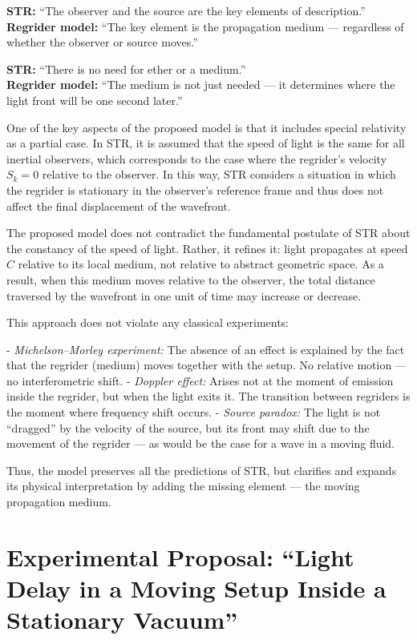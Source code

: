 \documentclass[12pt]{article}
\begin{document}
\textbf{STR:} “The observer and the source are the key elements of description.”\\
\textbf{Regrider model:} “The key element is the propagation medium — regardless of whether the observer or source moves.”

\textbf{STR:} “There is no need for ether or a medium.”\\
\textbf{Regrider model:} “The medium is not just needed — it determines where the light front will be one second later.”

One of the key aspects of the proposed model is that it includes special relativity as a partial case. In STR, it is assumed that the speed of light is the same for all inertial observers, which corresponds to the case where the regrider’s velocity $S_k = 0$ relative to the observer. In this way, STR considers a situation in which the regrider is stationary in the observer's reference frame and thus does not affect the final displacement of the wavefront.

The proposed model does not contradict the fundamental postulate of STR about the constancy of the speed of light. Rather, it refines it: light propagates at speed $C$ relative to its local medium, not relative to abstract geometric space. As a result, when this medium moves relative to the observer, the total distance traversed by the wavefront in one unit of time may increase or decrease.

This approach does not violate any classical experiments:

- \textit{Michelson–Morley experiment:} The absence of an effect is explained by the fact that the regrider (medium) moves together with the setup. No relative motion — no interferometric shift.
- \textit{Doppler effect:} Arises not at the moment of emission inside the regrider, but when the light exits it. The transition between regriders is the moment where frequency shift occurs.
- \textit{Source paradox:} The light is not “dragged” by the velocity of the source, but its front may shift due to the movement of the regrider — as would be the case for a wave in a moving fluid.

Thus, the model preserves all the predictions of STR, but clarifies and expands its physical interpretation by adding the missing element — the moving propagation medium.

\section*{Experimental Proposal: “Light Delay in a Moving Setup Inside a Stationary Vacuum”}
\end{document}
